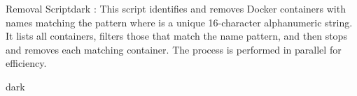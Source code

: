 \label{Removal Script}
\begin{baseBoxThree}{Removal Script}{dark}
    \bigskip
    : This script identifies and removes Docker containers with names matching the pattern  where  is a unique 16-character alphanumeric string.
    It lists all containers, filters those that match the name pattern, and then stops and removes each matching container.
    The process is performed in parallel for efficiency.
    \bigskip
    \begin{baseBoxThree}{}{dark}
    \end{baseBoxThree}
    \smallskip
\end{baseBoxThree}
